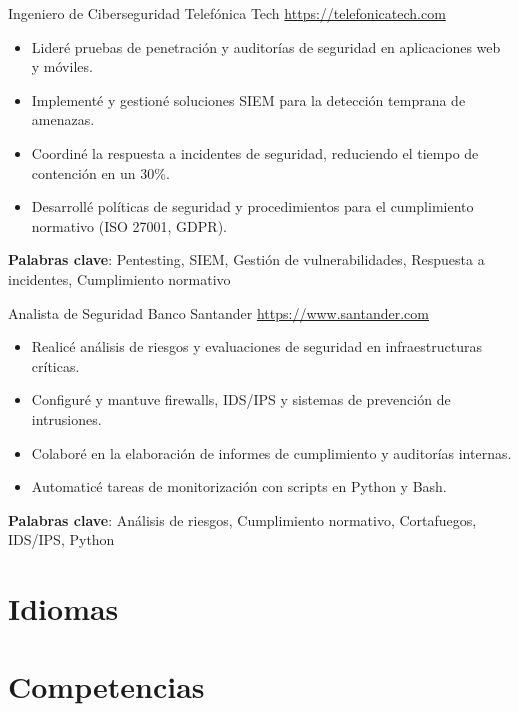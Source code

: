 \documentclass[a4paper, serif, 10pt]{moderncv}
\begin{document}
        {Ingeniero de Ciberseguridad}
        {Telefónica Tech}
        {\url{https://telefonicatech.com}}
        {}
        {\begin{itemize}
\item Lideré pruebas de penetración y auditorías de seguridad en aplicaciones web y móviles.
\item Implementé y gestioné soluciones SIEM para la detección temprana de amenazas.
\item Coordiné la respuesta a incidentes de seguridad, reduciendo el tiempo de contención en un 30\%.
\item Desarrollé políticas de seguridad y procedimientos para el cumplimiento normativo (ISO 27001, GDPR).
\end{itemize}
\textbf{Palabras clave}: Pentesting, SIEM, Gestión de vulnerabilidades, Respuesta a incidentes, Cumplimiento normativo}

        {Analista de Seguridad}
        {Banco Santander}
        {\url{https://www.santander.com}}
        {}
        {\begin{itemize}
\item Realicé análisis de riesgos y evaluaciones de seguridad en infraestructuras críticas.
\item Configuré y mantuve firewalls, IDS/IPS y sistemas de prevención de intrusiones.
\item Colaboré en la elaboración de informes de cumplimiento y auditorías internas.
\item Automaticé tareas de monitorización con scripts en Python y Bash.
\end{itemize}
\textbf{Palabras clave}: Análisis de riesgos, Cumplimiento normativo, Cortafuegos, IDS/IPS, Python}
\section{Idiomas}

\section{Competencias}

\end{document}
